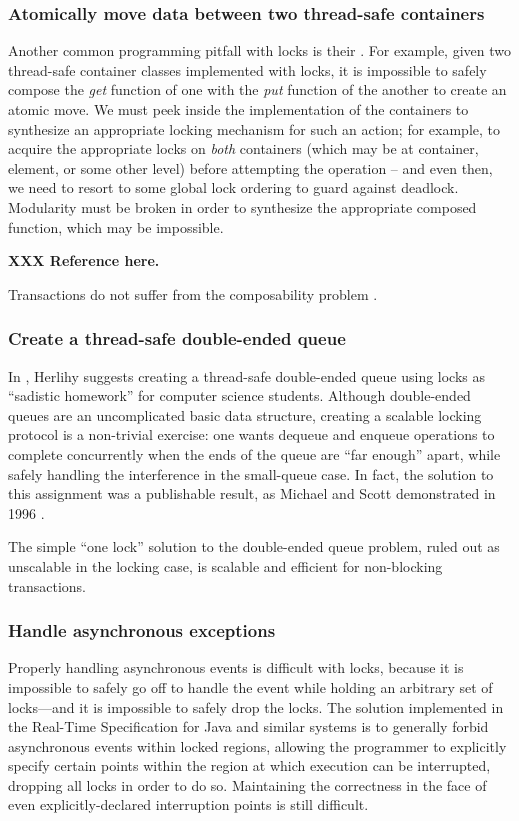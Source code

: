 
\subsubsection{Atomically move data between two thread-safe containers}
Another common programming pitfall with locks is their
.
For example, given two thread-safe
container classes implemented with locks, it is impossible to
safely compose
the \textit{get} function of one with the \textit{put} function of
the another to create an atomic move.  We must peek inside the
implementation of the containers to synthesize an appropriate locking
mechanism for such an action; for example, to acquire the appropriate
locks on \emph{both} containers (which may be at container, element,
or some other level) before attempting the operation -- and even then,
we need to resort to some global lock ordering to guard against
deadlock.  Modularity must be broken in order to synthesize the
appropriate composed function, which may be impossible.

{\bf XXX Reference \cite{Rinard98} here.}

Transactions do not suffer from the composability problem
\cite{HarrisMaPeHe05}.

\subsubsection{Create a thread-safe double-ended queue}
In \cite{Herlihy05}, Herlihy suggests creating a thread-safe
double-ended queue using locks as ``sadistic homework'' for computer
science students.  Although double-ended queues are an uncomplicated
basic data structure, creating a scalable locking protocol is a
non-trivial exercise: one wants dequeue and enqueue operations to
complete concurrently when the ends of the queue are ``far enough''
apart, while safely handling the interference in the small-queue case.
In fact, the solution to this assignment was a publishable result, as
Michael and Scott demonstrated in 1996 \cite{MichaelSc96}.

The simple ``one lock'' solution to the double-ended queue
problem, ruled out as unscalable in the locking case, is scalable and
efficient for non-blocking transactions.

\subsubsection{Handle asynchronous exceptions}
Properly handling asynchronous events is difficult with locks, because
it is impossible to safely go off to handle the event while holding an
arbitrary set of locks---and it is impossible to safely drop the
locks.  The solution implemented in the Real-Time Specification for
Java and similar systems is to generally forbid asynchronous events within
locked regions, allowing the programmer to explicitly specify certain
points within the region at which execution can be interrupted,
dropping all locks in order to do so.  Maintaining the correctness
in the face of even explicitly-declared interruption points is still
difficult.

